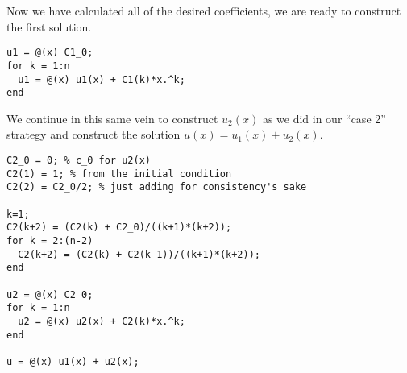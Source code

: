 Now we have calculated all of the desired coefficients, we are ready to construct the first solution.
\begin{lstlisting}[name=lec9_ex1,style=myMatlab]
u1 = @(x) C1_0;
for k = 1:n
  u1 = @(x) u1(x) + C1(k)*x.^k;
end
\end{lstlisting}
We continue in this same vein to construct $u_2(x)$ as we did in our ``case 2'' strategy and construct the solution $u(x) = u_1(x) + u_2(x)$.
\begin{lstlisting}[name=lec9_ex1,style=myMatlab]
C2_0 = 0; % c_0 for u2(x)
C2(1) = 1; % from the initial condition
C2(2) = C2_0/2; % just adding for consistency's sake

k=1;
C2(k+2) = (C2(k) + C2_0)/((k+1)*(k+2));
for k = 2:(n-2)
  C2(k+2) = (C2(k) + C2(k-1))/((k+1)*(k+2));
end

u2 = @(x) C2_0;
for k = 1:n
  u2 = @(x) u2(x) + C2(k)*x.^k;
end

u = @(x) u1(x) + u2(x);
\end{lstlisting}

